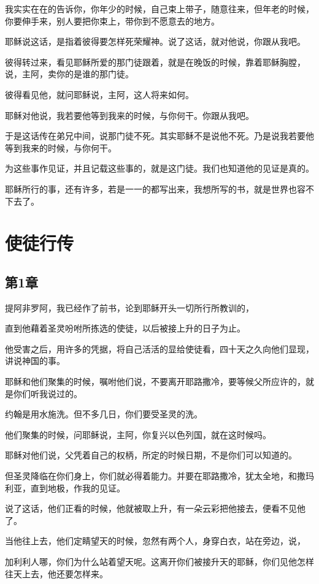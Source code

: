\documentclass[12pt,oneside]{book}
\begin{document}
我实实在在的告诉你，你年少的时候，自己束上带子，随意往来，但年老的时候，你要伸手来，别人要把你束上，带你到不愿意去的地方。

耶稣说这话，是指着彼得要怎样死荣耀神。说了这话，就对他说，你跟从我吧。

彼得转过来，看见耶稣所爱的那门徒跟着，就是在晚饭的时候，靠着耶稣胸膛，说，主阿，卖你的是谁的那门徒。

彼得看见他，就问耶稣说，主阿，这人将来如何。

耶稣对他说，我若要他等到我来的时候，与你何干。你跟从我吧。

于是这话传在弟兄中间，说那门徒不死。其实耶稣不是说他不死。乃是说我若要他等到我来的时候，与你何干。

为这些事作见证，并且记载这些事的，就是这门徒。我们也知道他的见证是真的。

耶稣所行的事，还有许多，若是一一的都写出来，我想所写的书，就是世界也容不下去了。

\part{使徒行传}
\chapter{第1章}
提阿非罗阿，我已经作了前书，论到耶稣开头一切所行所教训的，

直到他藉着圣灵吩咐所拣选的使徒，以后被接上升的日子为止。

他受害之后，用许多的凭据，将自己活活的显给使徒看，四十天之久向他们显现，讲说神国的事。

耶稣和他们聚集的时候，嘱咐他们说，不要离开耶路撒冷，要等候父所应许的，就是你们听我说过的。

约翰是用水施洗。但不多几日，你们要受圣灵的洗。

他们聚集的时候，问耶稣说，主阿，你复兴以色列国，就在这时候吗。

耶稣对他们说，父凭着自己的权柄，所定的时候日期，不是你们可以知道的。

但圣灵降临在你们身上，你们就必得着能力。并要在耶路撒冷，犹太全地，和撒玛利亚，直到地极，作我的见证。

说了这话，他们正看的时候，他就被取上升，有一朵云彩把他接去，便看不见他了。

当他往上去，他们定睛望天的时候，忽然有两个人，身穿白衣，站在旁边，说，

加利利人哪，你们为什么站着望天呢。这离开你们被接升天的耶稣，你们见他怎样往天上去，他还要怎样来。
\end{document}
